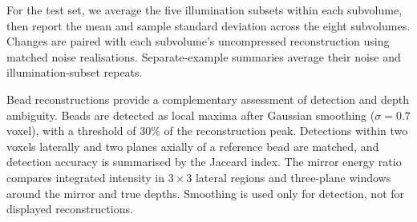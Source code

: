 For the test set, we average the five illumination subsets within each subvolume, then report the mean and sample standard deviation across the eight subvolumes. Changes are paired with each subvolume's uncompressed reconstruction using matched noise realisations. Separate-example summaries average their noise and illumination-subset repeats.

Bead reconstructions provide a complementary assessment of detection and depth ambiguity. Beads are detected as local maxima after Gaussian smoothing (\(\sigma=0.7\) voxel), with a threshold of 30\% of the reconstruction peak. Detections within two voxels laterally and two planes axially of a reference bead are matched, and detection accuracy is summarised by the Jaccard index. The mirror energy ratio compares integrated intensity in \(3\times3\) lateral regions and three-plane windows around the mirror and true depths. Smoothing is used only for detection, not for displayed reconstructions.
